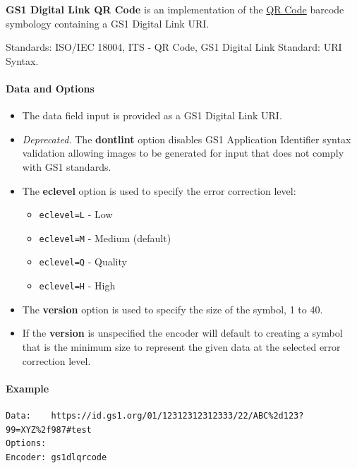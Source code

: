 \textbf{GS1 Digital Link QR Code} is an implementation of the
\protect\hyperlink{qr-code}{QR Code} barcode symbology containing a GS1
Digital Link URI.

Standards: ISO/IEC 18004, ITS - QR Code, GS1 Digital Link Standard: URI
Syntax.

\hypertarget{data-and-options-31}{%
\paragraph{Data and Options}\label{data-and-options-31}}

\begin{itemize}
\tightlist
\item
  The data field input is provided as a GS1 Digital Link URI.
\item
  \emph{Deprecated.} The \textbf{dontlint} option disables GS1
  Application Identifier syntax validation allowing images to be
  generated for input that does not comply with GS1 standards.
\item
  The \textbf{eclevel} option is used to specify the error correction
  level:

  \begin{itemize}
  \tightlist
  \item
    \texttt{eclevel=L} - Low
  \item
    \texttt{eclevel=M} - Medium (default)
  \item
    \texttt{eclevel=Q} - Quality
  \item
    \texttt{eclevel=H} - High
  \end{itemize}
\item
  The \textbf{version} option is used to specify the size of the symbol,
  1 to 40.
\item
  If the \textbf{version} is unspecified the encoder will default to
  creating a symbol that is the minimum size to represent the given data
  at the selected error correction level.
\end{itemize}

\hypertarget{example-7}{%
\paragraph{Example}\label{example-7}}

\begin{verbatim}
Data:    https://id.gs1.org/01/12312312312333/22/ABC%2d123?99=XYZ%2f987#test
Options: 
Encoder: gs1dlqrcode
\end{verbatim}

